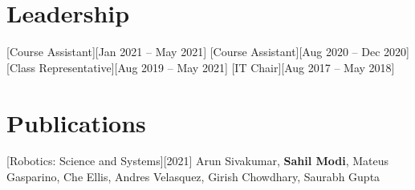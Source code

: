 \documentclass{article}
\begin{document}
\section{Leadership}
[Course Assistant][Jan 2021 -- May 2021]
[Course Assistant][Aug 2020 -- Dec 2020]
[Class Representative][Aug 2019 -- May 2021]
[IT Chair][Aug 2017 -- May 2018]

\section{Publications}
[Robotics: Science and Systems][2021]
Arun Sivakumar, \textbf{Sahil Modi}, Mateus Gasparino, Che Ellis, Andres Velasquez, Girish Chowdhary, Saurabh Gupta
\end{document}
